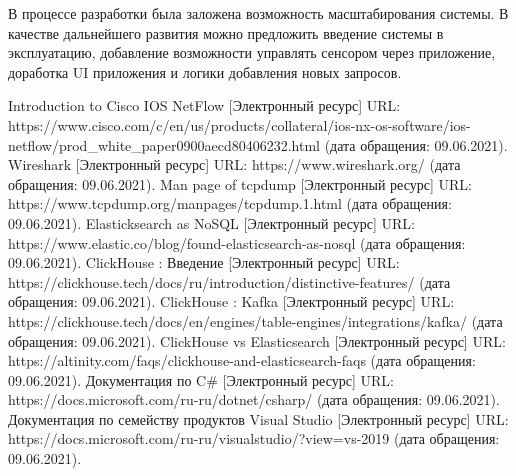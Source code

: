 В процессе разработки была заложена возможность масштабирования системы. В качестве дальнейшего развития можно предложить введение системы в эксплуатацию, добавление возможности управлять сенсором через приложение, доработка UI приложения и логики добавления новых запросов.

\clearpage
\begin{thebibliography}{9}
	 Introduction to Cisco IOS NetFlow [Электронный ресурс] URL: https://www.cisco.com/c/en/us/products/collateral/ios-nx-os-software/ios-netflow/prod\_white\_paper0900aecd80406232.html (дата обращения: 09.06.2021).
	 Wireshark [Электронный ресурс] URL: https://www.wireshark.org/ (дата обращения: 09.06.2021).
	 Man page of tcpdump [Электронный ресурс] URL: https://www.tcpdump.org/manpages/tcpdump.1.html (дата обращения: 09.06.2021).
	 Elasticksearch as NoSQL [Электронный ресурс] URL:  https://www.elastic.co/blog/found-elasticsearch-as-nosql (дата обращения: 09.06.2021).
	 ClickHouse : Введение [Электронный ресурс] URL: https://clickhouse.tech/docs/ru/introduction/distinctive-features/ (дата обращения: 09.06.2021).
	 ClickHouse : Kafka [Электронный ресурс] URL: https://clickhouse.tech/docs/en/engines/table-engines/integrations/kafka/ (дата обращения: 09.06.2021).
	 ClickHouse vs Elasticsearch [Электронный ресурс] URL: https://altinity.com/faqs/clickhouse-and-elasticsearch-faqs (дата обращения: 09.06.2021).
	 Документация по C\# [Электронный ресурс] URL: https://docs.microsoft.com/ru-ru/dotnet/csharp/ (дата обращения: 09.06.2021).
	 Документация по семейству продуктов Visual Studio [Электронный ресурс] URL: https://docs.microsoft.com/ru-ru/visualstudio/?view=vs-2019 (дата обращения: 09.06.2021).
\end{thebibliography}



